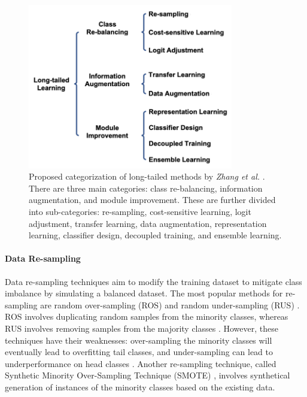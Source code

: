 \begin{figure}[ht]
    \centering
    \includegraphics[width=0.8\textwidth]{Images/lt_methods_categories.png} 
    \caption{Proposed categorization of long-tailed methods by \emph{Zhang et al.} \cite{zhang2023deep}. There are three main categories: class re-balancing, information augmentation, and module improvement. These are further divided into sub-categories: re-sampling, cost-sensitive learning, logit adjustment, transfer learning, data augmentation, representation learning, classifier design, decoupled training, and ensemble learning.}
    \label{fig:lt_methods} 
\end{figure}


\paragraph{Data Re-sampling}
Data re-sampling techniques aim to modify the training dataset to mitigate class imbalance by simulating a balanced dataset. The most popular methods for re-sampling are random over-sampling (ROS) and random under-sampling (RUS) \cite{Chawla_2002,han2005}. ROS involves duplicating random samples from the minority classes, whereas RUS involves removing samples from the majority classes \cite{zhang2023deep,han2005}. However, these techniques have their weaknesses: over-sampling the minority classes will eventually lead to overfitting tail classes, and under-sampling can lead to underperformance on head classes \cite{zhang2023deep}. Another re-sampling technique, called Synthetic Minority Over-Sampling Technique (SMOTE) \cite{Chawla_2002}, involves synthetical generation of instances of the minority classes based on the existing data. 


